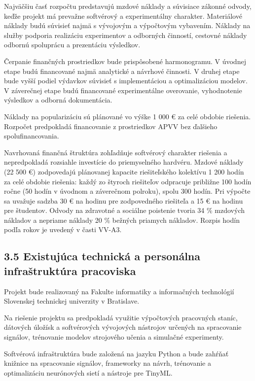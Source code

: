 \documentclass[10pt,a4paper]{article}
\begin{document}
Najväčšiu časť rozpočtu predstavujú mzdové náklady a súvisiace zákonné odvody, keďže projekt má prevažne softvérový a experimentálny charakter. Materiálové náklady budú súvisieť najmä s vývojovým a výpočtovým vybavením. Náklady na služby podporia realizáciu experimentov a odborných činností, cestovné náklady odbornú spoluprácu a prezentáciu výsledkov.

Čerpanie finančných prostriedkov bude prispôsobené harmonogramu. V úvodnej etape budú financované najmä analytické a návrhové činnosti. V druhej etape bude vyšší podiel výdavkov súvisieť s implementáciou a optimalizáciou modelov. V záverečnej etape budú financované experimentálne overovanie, vyhodnotenie výsledkov a odborná dokumentácia.

Náklady na popularizáciu sú plánované vo výške 1 000 € za celé obdobie riešenia. Rozpočet predpokladá financovanie z prostriedkov APVV bez ďalšieho spolufinancovania.

Navrhovaná finančná štruktúra zohľadňuje softvérový charakter riešenia a nepredpokladá rozsiahle investície do priemyselného hardvéru. Mzdové náklady (22 500 €) zodpovedajú plánovanej kapacite riešiteľského kolektívu 1 200 hodín za celé obdobie riešenia: každý zo štyroch riešiteľov odpracuje približne 100 hodín ročne (50 hodín v úvodnom a záverečnom polroku), spolu 300 hodín. Pri výpočte sa uvažuje sadzba 30 € na hodinu pre zodpovedného riešiteľa a 15 € na hodinu pre študentov. Odvody na zdravotné a sociálne poistenie tvoria 34 \% mzdových nákladov a nepriame náklady 20 \% bežných priamych nákladov. Rozpis hodín podľa rokov je uvedený v časti VV-A3.

\subsection*{3.5 Existujúca technická a personálna
infraštruktúra pracoviska}

Projekt bude realizovaný na Fakulte informatiky a informačných technológií Slovenskej technickej univerzity v Bratislave.

Na riešenie projektu sa predpokladá využitie výpočtových pracovných staníc, dátových úložísk a softvérových vývojových nástrojov určených na spracovanie signálov, trénovanie modelov strojového učenia a simulačné experimenty.

Softvérová infraštruktúra bude založená na jazyku Python a bude zahŕňať knižnice na spracovanie signálov, frameworky na návrh, trénovanie a optimalizáciu neurónových sietí a nástroje pre TinyML.
\end{document}
